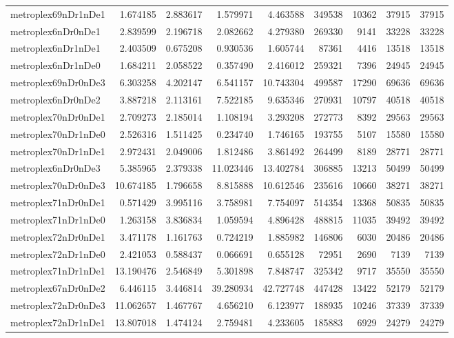 \documentclass[../../../thesis.tex]{subfiles}
\begin{document}
\begin{longtable}{|l|r|r|r|r|r|r|r|r|}
metroplex69nDr1nDe1 & 1.674185 & 2.883617 & 1.579971 & 4.463588 & 349538 & 10362 & 37915 & 37915 \\
metroplex6nDr0nDe1 & 2.839599 & 2.196718 & 2.082662 & 4.279380 & 269330 & 9141 & 33228 & 33228 \\
metroplex6nDr1nDe1 & 2.403509 & 0.675208 & 0.930536 & 1.605744 & 87361 & 4416 & 13518 & 13518 \\
metroplex6nDr1nDe0 & 1.684211 & 2.058522 & 0.357490 & 2.416012 & 259321 & 7396 & 24945 & 24945 \\
metroplex69nDr0nDe3 & 6.303258 & 4.202147 & 6.541157 & 10.743304 & 499587 & 17290 & 69636 & 69636 \\
metroplex6nDr0nDe2 & 3.887218 & 2.113161 & 7.522185 & 9.635346 & 270931 & 10797 & 40518 & 40518 \\
metroplex70nDr0nDe1 & 2.709273 & 2.185014 & 1.108194 & 3.293208 & 272773 & 8392 & 29563 & 29563 \\
metroplex70nDr1nDe0 & 2.526316 & 1.511425 & 0.234740 & 1.746165 & 193755 & 5107 & 15580 & 15580 \\
metroplex70nDr1nDe1 & 2.972431 & 2.049006 & 1.812486 & 3.861492 & 264499 & 8189 & 28771 & 28771 \\
metroplex6nDr0nDe3 & 5.385965 & 2.379338 & 11.023446 & 13.402784 & 306885 & 13213 & 50499 & 50499 \\
metroplex70nDr0nDe3 & 10.674185 & 1.796658 & 8.815888 & 10.612546 & 235616 & 10660 & 38271 & 38271 \\
metroplex71nDr0nDe1 & 0.571429 & 3.995116 & 3.758981 & 7.754097 & 514354 & 13368 & 50835 & 50835 \\
metroplex71nDr1nDe0 & 1.263158 & 3.836834 & 1.059594 & 4.896428 & 488815 & 11035 & 39492 & 39492 \\
metroplex72nDr0nDe1 & 3.471178 & 1.161763 & 0.724219 & 1.885982 & 146806 & 6030 & 20486 & 20486 \\
metroplex72nDr1nDe0 & 2.421053 & 0.588437 & 0.066691 & 0.655128 & 72951 & 2690 & 7139 & 7139 \\
metroplex71nDr1nDe1 & 13.190476 & 2.546849 & 5.301898 & 7.848747 & 325342 & 9717 & 35550 & 35550 \\
metroplex67nDr0nDe2 & 6.446115 & 3.446814 & 39.280934 & 42.727748 & 447428 & 13422 & 52179 & 52179 \\
metroplex72nDr0nDe3 & 11.062657 & 1.467767 & 4.656210 & 6.123977 & 188935 & 10246 & 37339 & 37339 \\
metroplex72nDr1nDe1 & 13.807018 & 1.474124 & 2.759481 & 4.233605 & 185883 & 6929 & 24279 & 24279 \\

\end{longtable}
\end{document}
